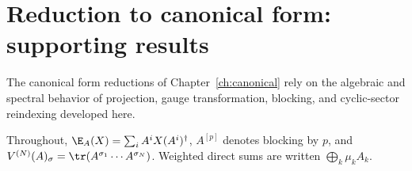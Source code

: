 \chapter{Reduction to canonical form: supporting results}
\label{ch:canonical_supporting_results}

The canonical form reductions of Chapter~\ref{ch:canonical} rely on the
algebraic and spectral behavior of projection, gauge transformation, blocking,
and cyclic-sector reindexing developed here.

Throughout, $\E_A(X)=\sum_iA^iX(A^i)^\dagger$, $A^{[p]}$ denotes blocking by $p$, and $V^{(N)}(A)_\sigma=\tr(A^{\sigma_1}\cdots A^{\sigma_N})$. Weighted direct sums are written $\bigoplus_k\mu_kA_k$.



